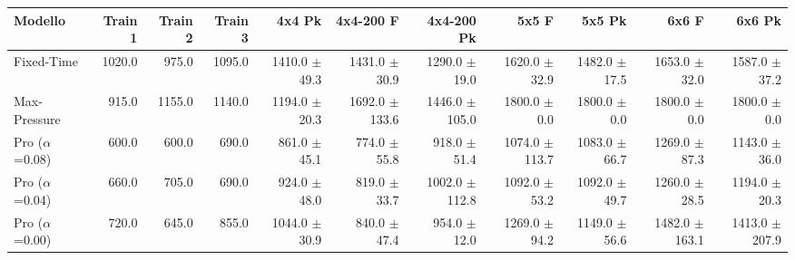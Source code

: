 \begin{table}
  \centering
  \tiny
  \begin{tabular}{@{}lrrrrrrrrrr@{}}
    \toprule
    Modello                   & Train 1 & Train 2 & Train 3 & 4x4 Pk                                        & 4x4-200 F                                     & 4x4-200 Pk                                    & 5x5 F                                         & 5x5 Pk                                        & 6x6 F                                         & 6x6 Pk                                        \\
    \midrule
    Fixed-Time                & 1020.0  & 975.0   & 1095.0  & 1410.0 {\fontsize{4}{4}\selectfont$\pm$49.3}  & 1431.0 {\fontsize{4}{4}\selectfont$\pm$30.9}  & 1290.0 {\fontsize{4}{4}\selectfont$\pm$19.0}  & 1620.0 {\fontsize{4}{4}\selectfont$\pm$32.9}  & 1482.0 {\fontsize{4}{4}\selectfont$\pm$17.5}  & 1653.0 {\fontsize{4}{4}\selectfont$\pm$32.0}  & 1587.0 {\fontsize{4}{4}\selectfont$\pm$37.2}  \\
    Max-Pressure              & 915.0   & 1155.0  & 1140.0  & 1194.0 {\fontsize{4}{4}\selectfont$\pm$20.3}  & 1692.0 {\fontsize{4}{4}\selectfont$\pm$133.6} & 1446.0 {\fontsize{4}{4}\selectfont$\pm$105.0} & 1800.0 {\fontsize{4}{4}\selectfont$\pm$0.0}   & 1800.0 {\fontsize{4}{4}\selectfont$\pm$0.0}   & 1800.0 {\fontsize{4}{4}\selectfont$\pm$0.0}   & 1800.0 {\fontsize{4}{4}\selectfont$\pm$0.0}   \\
    Pro ($\alpha$=0.08)       & 600.0   & 600.0   & 690.0   & 861.0 {\fontsize{4}{4}\selectfont$\pm$45.1}   & 774.0 {\fontsize{4}{4}\selectfont$\pm$55.8}   & 918.0 {\fontsize{4}{4}\selectfont$\pm$51.4}   & 1074.0 {\fontsize{4}{4}\selectfont$\pm$113.7} & 1083.0 {\fontsize{4}{4}\selectfont$\pm$66.7}  & 1269.0 {\fontsize{4}{4}\selectfont$\pm$87.3}  & 1143.0 {\fontsize{4}{4}\selectfont$\pm$36.0}  \\
    Pro ($\alpha$=0.04)       & 660.0   & 705.0   & 690.0   & 924.0 {\fontsize{4}{4}\selectfont$\pm$48.0}   & 819.0 {\fontsize{4}{4}\selectfont$\pm$33.7}   & 1002.0 {\fontsize{4}{4}\selectfont$\pm$112.8} & 1092.0 {\fontsize{4}{4}\selectfont$\pm$53.2}  & 1092.0 {\fontsize{4}{4}\selectfont$\pm$49.7}  & 1260.0 {\fontsize{4}{4}\selectfont$\pm$28.5}  & 1194.0 {\fontsize{4}{4}\selectfont$\pm$20.3}  \\
    Pro ($\alpha$=0.00)       & 720.0   & 645.0   & 855.0   & 1044.0 {\fontsize{4}{4}\selectfont$\pm$30.9}  & 840.0 {\fontsize{4}{4}\selectfont$\pm$47.4}   & 954.0 {\fontsize{4}{4}\selectfont$\pm$12.0}   & 1269.0 {\fontsize{4}{4}\selectfont$\pm$94.2}  & 1149.0 {\fontsize{4}{4}\selectfont$\pm$56.6}  & 1482.0 {\fontsize{4}{4}\selectfont$\pm$163.1} & 1413.0 {\fontsize{4}{4}\selectfont$\pm$207.9} \\

\end{tabular}
\end{table}
